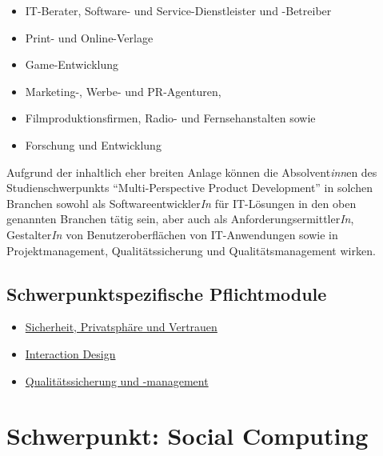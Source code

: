 \begin{itemize}
\tightlist
\item
  IT-Berater, Software- und Service-Dienstleister und -Betreiber
\item
  Print- und Online-Verlage
\item
  Game-Entwicklung
\item
  Marketing-, Werbe- und PR-Agenturen,
\item
  Filmproduktionsfirmen, Radio- und Fernsehanstalten sowie
\item
  Forschung und Entwicklung
\end{itemize}

Aufgrund der inhaltlich eher breiten Anlage können die
Absolvent\emph{inn}en des Studienschwerpunkts ``Multi-Perspective
Product Development'' in solchen Branchen sowohl als
Softwareentwickler\emph{In} für IT-Lösungen in den oben genannten
Branchen tätig sein, aber auch als Anforderungsermittler\emph{In},
Gestalter\emph{In} von Benutzeroberflächen von IT-Anwendungen sowie in
Projektmanagement, Qualitätssicherung und Qualitätsmanagement wirken.

\section*{Schwerpunktspezifische
Pflichtmodule\label{/mi-2017/modulbeschreibungen-master/schwerpunkt-multiperspective-product-development}}\label{schwerpunktspezifische-pflichtmodulepathlabelmi-2017modulbeschreibungen-masterschwerpunkt-multiperspective-product-development}

\begin{itemize}
\tightlist
\item
  \hyperref[/mi-2017/modulbeschreibungen-master/MA_WTW_Modul_IT-Sicherheit]{Sicherheit,
  Privatsphäre und Vertrauen}
\item
  \hyperref[/mi-2017/modulbeschreibungen-master/MA_HCI_InteractionDesign]{Interaction
  Design}
\item
  \hyperref[/mi-2017/modulbeschreibungen-master/MA_WTW_Modul_QUS_Winter]{Qualitätssicherung
  und -management}
\end{itemize}

\chapter{Schwerpunkt: Social
Computing\label{/mi-2017/modulbeschreibungen-master/schwerpunkt-soziotechnische-systeme}}\label{schwerpunkt-social-computingpathlabelmi-2017modulbeschreibungen-masterschwerpunkt-soziotechnische-systeme}

